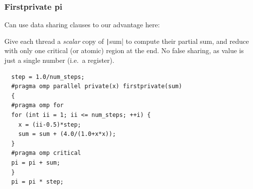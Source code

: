 \documentclass{beamer}
\begin{document}
%
\begin{frame}[fragile]
\frametitle{Firstprivate pi}
Can use data sharing clauses to our advantage here:

Give each thread a \emph{scalar} copy of \texttt|sum| to compute their partial sum, and reduce with only one critical (or atomic) region at the end.
No false sharing, as value is just a single number (i.e.\ a register).
\begin{verbatim}
  step = 1.0/num_steps;
  #pragma omp parallel private(x) firstprivate(sum)
  {
  #pragma omp for
  for (int ii = 1; ii <= num_steps; ++i) {
    x = (ii-0.5)*step;
    sum = sum + (4.0/(1.0+x*x));
  }
  #pragma omp critical
  pi = pi + sum;
  }
  pi = pi * step;
\end{verbatim}
\end{frame}
\end{document}
